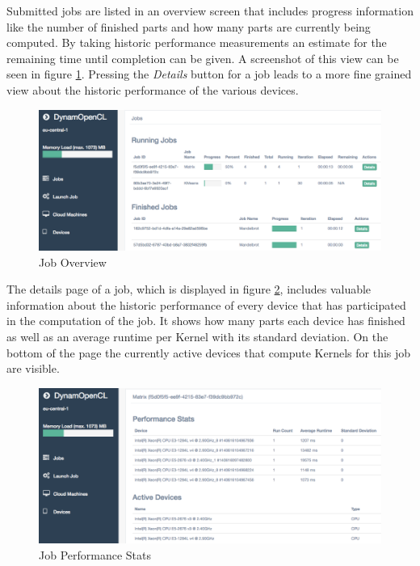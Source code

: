 Submitted jobs are listed in an overview screen that includes progress information like the number of finished parts and how many parts are currently being computed. By taking historic performance measurements an estimate for the remaining time until completion can be given. A screenshot of this view can be seen in figure \ref{img:job_overview}. Pressing the \textit{Details} button for a job leads to a more fine grained view about the historic performance of the various devices.

\begin{figure}[!htb]
	\includegraphics[width=1\textwidth]{screenshots/job_overview.png}
	\centering
	\caption{Job Overview}
	\label{img:job_overview}
\end{figure}

The details page of a job, which is displayed in figure \ref{img:job_details}, includes valuable information about the historic performance of every device that has participated in the computation of the job. It shows how many parts each device has finished as well as an average runtime per Kernel with its standard deviation. On the bottom of the page the currently active devices that compute Kernels for this job are visible.

\begin{figure}[!htb]
	\includegraphics[width=1\textwidth]{screenshots/job_details.png}
	\centering
	\caption{Job Performance Stats}
	\label{img:job_details}
\end{figure}
